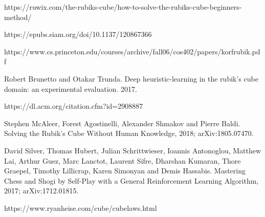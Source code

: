 \documentclass[10pt,twocolumn,letterpaper]{article}
\begin{document}
\begin{thebibliography}{9}

\bibitem{}
https://ruwix.com/the-rubiks-cube/how-to-solve-the-rubiks-cube-beginners-method/

\bibitem{}
https://epubs.siam.org/doi/10.1137/120867366

\bibitem{}
https://www.cs.princeton.edu/courses/archive/fall06/cos402/papers/korfrubik.pdf

\bibitem{}
Robert Brunetto and Otakar Trunda. Deep heuristic-learning in the rubik’s cube domain: an experimental evaluation. 2017.

\bibitem{}
https://dl.acm.org/citation.cfm?id=2908887

Stephen McAleer, Forest Agostinelli, Alexander Shmakov and Pierre Baldi.
\newblock Solving the Rubik's Cube Without Human Knowledge, 2018;
\newblock arXiv:1805.07470.

David Silver, Thomas Hubert, Julian Schrittwieser, Ioannis Antonoglou, Matthew Lai, Arthur Guez, Marc Lanctot, Laurent Sifre, Dharshan Kumaran, Thore Graepel, Timothy Lillicrap, Karen Simonyan and Demis Hassabis.
\newblock Mastering Chess and Shogi by Self-Play with a General Reinforcement Learning Algorithm, 2017;
\newblock arXiv:1712.01815.

\bibitem{}
https://www.ryanheise.com/cube/cube\textunderscore laws.html


\end{thebibliography}

{\small


}
\end{document}
